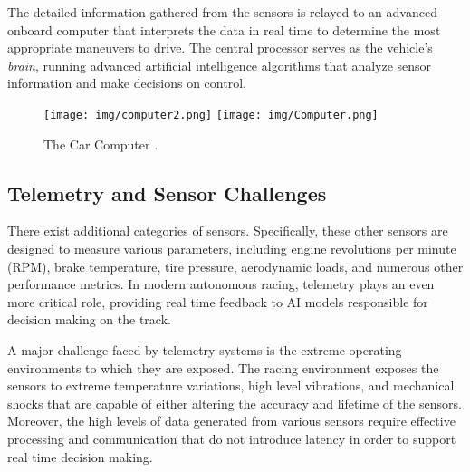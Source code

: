 \documentclass[a4paper,final,12pt]{report}
\begin{document}
The detailed information gathered from the sensors is relayed to an advanced onboard computer that interprets the data in real time to determine the most appropriate maneuvers to drive. The central processor serves as the vehicle's \textit{brain}, running advanced artificial intelligence algorithms that analyze sensor information and make decisions on control.
\begin{figure}[hbtp]
\centering
\texttt{[image: img/computer2.png]}
\texttt{[image: img/Computer.png]}
\caption{The Car Computer \cite{AbuDhabiRacing2024}.}
\label{figura:computer}
\end{figure}

\subsection{Telemetry and Sensor Challenges}
There exist additional categories of sensors. Specifically, these other sensors are designed to measure various parameters, including engine revolutions per minute (RPM), brake temperature, tire pressure, aerodynamic loads, and numerous other performance metrics. In modern autonomous racing, telemetry plays an even more critical role, providing real time feedback to AI models responsible for decision making on the track.

A major challenge faced by telemetry systems is the extreme operating environments to which they are exposed. The racing environment exposes the sensors to extreme temperature variations, high level vibrations, and mechanical shocks that are capable of either altering the accuracy and lifetime of the sensors. Moreover, the high levels of data generated from various sensors require effective processing and communication that do not introduce latency in order to support real time decision making.
\end{document}
